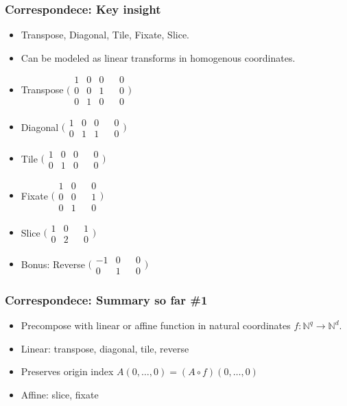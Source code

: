 \documentclass[xetex,mathserif,serif]{beamer}
\newcommand\Nat{\mathbb{N}}
\begin{document}
\begin{frame}
  \frametitle{Correspondece: Key insight}
  \pause
  \begin{itemize}[<+->]
    \item Transpose, Diagonal, Tile, Fixate, Slice.
    \item Can be modeled as linear transforms in homogenous coordinates.
    \item Transpose \(\bigg(\begin{smallmatrix} 1 & 0 & 0 && 0 \\ 0 & 0 & 1 && 0 \\ 0 & 1 & 0 && 0 \end{smallmatrix}\bigg)\)
    \item Diagonal \(\big(\begin{smallmatrix} 1 & 0 & 0 && 0 \\ 0 & 1 & 1 && 0 \end{smallmatrix}\big)\)
    \item Tile \(\big(\begin{smallmatrix} 1 & 0 & 0 && 0 \\ 0 & 1 & 0 && 0 \end{smallmatrix}\big)\)
    \item Fixate \(\bigg(\begin{smallmatrix} 1 & 0 && 0 \\ 0 & 0 && 1 \\ 0 & 1 && 0 \end{smallmatrix}\bigg)\)
    \item Slice \(\big(\begin{smallmatrix} 1 & 0 && 1 \\ 0 & 2 && 0 \end{smallmatrix}\big)\)
    \item Bonus: Reverse \(\big(\begin{smallmatrix} -1 & 0 && 0 \\ 0 & 1 && 0 \end{smallmatrix}\big)\)
  \end{itemize}
\end{frame}

\begin{frame}
  \frametitle{Correspondece: Summary so far \#1}
  \pause
  \begin{itemize}[<+->]
    \item Precompose with linear or affine function in natural coordinates \(f : \Nat^q \to \Nat^d\).
    \item Linear: transpose, diagonal, tile, reverse
    \item Preserves origin index \(A(0, \dots, 0) = (A \circ f)(0, \dots, 0)\)
    \item Affine: slice, fixate
  \end{itemize}
\end{frame}
\end{document}
